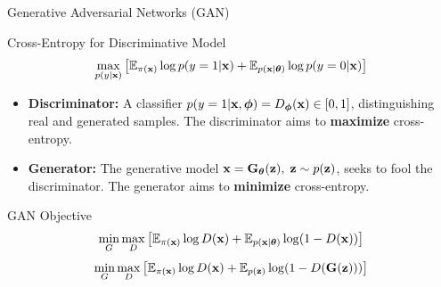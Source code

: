 \documentclass{beamer}
\begin{document}
\begin{frame}{Generative Adversarial Networks (GAN)}
	\begin{block}{Cross-Entropy for Discriminative Model}
		\vspace{-0.3cm}
		\[
			\max_{p(y | \mathbf{x})} \left[\mathbb{E}_{\pi(\mathbf{x})} \log p(y = 1 | \mathbf{x}) + \mathbb{E}_{p(\mathbf{x} | \boldsymbol{\theta})} \log p(y = 0 | \mathbf{x}) \right] 
		\]
	\end{block}
	\eqpause
	\begin{itemize}
		\item \textbf{Discriminator:} A classifier $p(y = 1 | \mathbf{x}, \boldsymbol{\phi}) = D_{\boldsymbol{\phi}}(\mathbf{x}) \in [0, 1]$, distinguishing real and generated samples. The discriminator aims to \textbf{maximize} cross-entropy.
		\item \textbf{Generator:} The generative model $\mathbf{x} = \mathbf{G}_{\boldsymbol{\theta}}(\mathbf{z}),\; \mathbf{z} \sim p(\mathbf{z})$, seeks to fool the discriminator. The generator aims to \textbf{minimize} cross-entropy.
	\end{itemize}
	\eqpause
	\begin{block}{GAN Objective}
		\vspace{-0.5cm}
		\[
			\min_{G} \max_D \left[ \mathbb{E}_{\pi(\mathbf{x})} \log D(\mathbf{x}) + \mathbb{E}_{p(\mathbf{x} | \boldsymbol{\theta})} \log (1 - D(\mathbf{x})) \right] 
		\]
		\eqpause
		\[
			\min_{G} \max_D \left[ \mathbb{E}_{\pi(\mathbf{x})} \log D(\mathbf{x}) + \mathbb{E}_{p(\mathbf{z})} \log (1 - D(\mathbf{G}(\mathbf{z}))) \right]
		\]
	\end{block}
\end{frame}
\end{document}
